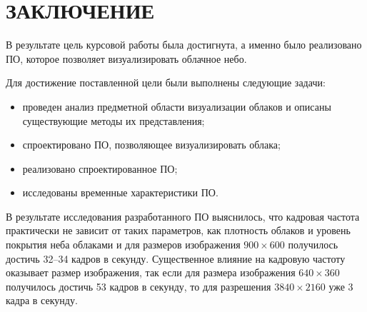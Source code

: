 \chapter*{ЗАКЛЮЧЕНИЕ}

В результате цель курсовой работы была достигнута, а именно было реализовано ПО,
которое позволяет визуализировать облачное небо. 

Для достижение поставленной цели были выполнены следующие задачи:
\begin{itemize}
	\item проведен анализ предметной области визуализации облаков и описаны существующие методы их представления;
	\item спроектировано ПО, позволяющее визуализировать облака;
	\item реализовано спроектированное ПО;
	\item исследованы временные характеристики ПО.
\end{itemize}

В результате исследования разработанного ПО выяснилось, что кадровая частота практически не зависит от таких параметров, как плотность облаков и уровень покрытия неба облаками и для размеров изображения $900 \times 600$ получилось достичь 32--34 кадров в секунду.
Существенное влияние на кадровую частоту оказывает размер изображения, так если для размера изображения $640 \times 360$ получилось достичь 53 кадров в секунду, то для разрешения $3840 \times 2160$ уже 3 кадра в секунду.




